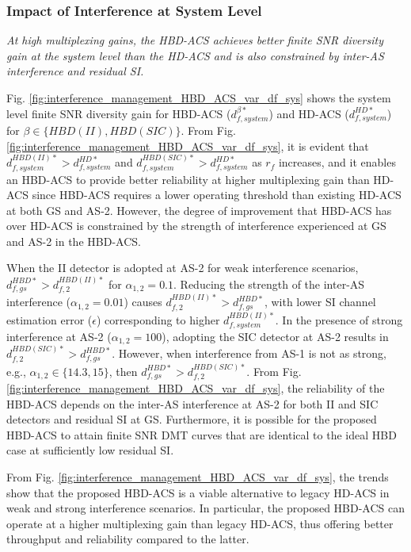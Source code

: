 \subsubsection{Impact of Interference at System Level}

\begin{observation}
\emph{\emph{At high multiplexing gains, the HBD-ACS achieves better finite SNR diversity gain at the system level than the HD-ACS and is also constrained by inter-AS interference and residual SI.}
}\end{observation}

Fig. \ref{fig:interference_management_HBD_ACS_var_df_sys} shows the system level finite SNR diversity gain for HBD-ACS ($d_{f,system}^{\beta*}$) and HD-ACS ($d_{f,system}^{HD*}$) for $\beta \in \{HBD(II), HBD(SIC)\}$. From Fig. \ref{fig:interference_management_HBD_ACS_var_df_sys}, it is evident that $d_{f,system}^{HBD(II)*} > d_{f,system}^{HD*}$ and $d_{f,system}^{HBD(SIC)*} > d_{f,system}^{HD*}$ as $r_f$ increases, and it enables an HBD-ACS to provide better reliability at higher multiplexing gain than HD-ACS since HBD-ACS requires a lower operating threshold than existing HD-ACS at both GS and AS-2. However, the degree of improvement that HBD-ACS has over HD-ACS is constrained by the strength of interference experienced at GS and AS-2 in the HBD-ACS.

When the II detector is adopted at AS-2 for weak interference scenarios, $d_{f,gs}^{HBD*} > d_{f,2}^{HBD(II)*}$ for $\alpha_{1,2}=0.1$. Reducing the strength of the inter-AS interference ($\alpha_{1,2}=0.01$) causes $d_{f,2}^{HBD(II)*} > d_{f,gs}^{HBD*}$, with lower SI channel estimation error ($\epsilon $) corresponding to higher $d_{f,system}^{HBD(II)*}$. In the presence of strong interference at AS-2 ($\alpha_{1,2}=100$), adopting the SIC detector at AS-2 results in $d_{f,2}^{HBD(SIC)*} > d_{f,gs}^{HBD*}$. However, when interference from AS-1 is not as strong, e.g., $\alpha_{1,2} \in \{14.3, 15\}$, then $d_{f,gs}^{HBD*} > d_{f,2}^{HBD(SIC)*}$. From Fig. \ref{fig:interference_management_HBD_ACS_var_df_sys}, the reliability of the HBD-ACS depends on the inter-AS interference at AS-2 for both II and SIC detectors and residual SI at GS. Furthermore, it is possible for the proposed HBD-ACS to attain finite SNR DMT curves that are identical to the ideal HBD case at sufficiently low residual SI.

From Fig. \ref{fig:interference_management_HBD_ACS_var_df_sys}, the trends show that the proposed HBD-ACS is a viable alternative to legacy HD-ACS in weak and strong interference scenarios. In particular, the proposed HBD-ACS can operate at a higher multiplexing gain than legacy HD-ACS, thus offering better throughput and reliability compared to the latter.

